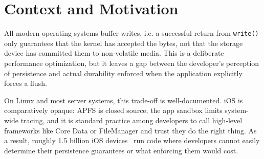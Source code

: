 \maketitle

\begin{abstract}
iOS persistence APIs make writes appear instantaneous by buffering in memory and flushing asynchronously, obscur-ing both when data becomes persisted and how much a developer pays to guarantee that durability. We built an iOS benchmarking app comparing three strategies: Core Data, an append-only log over FileManager, and per-event file writes, under default and aggressive (\verb|F_FULLFSYNC|) flush modes across seven payload sizes from 100 bytes to 50 MB. Across these 42 configurations, we discover that flush mode dominates latency. Aggressive flushing slows small Core Data writes ~235x and inflates a 50 MB Core Data write ~85,000x relative to default. Append-only writes pay only a 1.06–2.2x penalty, suggesting the choice of API matters far less than whether the developer ever forces a true flush. These results expose the implicit durability policies of iOS frameworks and the trade-offs they hide from app developers.
\end{abstract}


\section{Context and Motivation}

All modern operating systems buffer writes, i.e. a successful return from \verb|write()| only guarantees that the kernel has accepted the bytes, not that the storage device has committed them to non-volatile media. This is a deliberate performance optimization, but it leaves a gap between the developer's perception of persistence and actual durability enforced when the application explicitly forces a flush.

On Linux and most server systems, this trade-off is well-documented. iOS is comparatively opaque: APFS is closed source, the app sandbox limits system-wide tracing, and it is standard practice among developers to call high-level frameworks like Core Data or FileManager and trust they do the right thing. As a result, roughly 1.5 billion iOS devices~\cite{macrumors2026activedevices} run code where developers cannot easily determine their persistence guarantees or what enforcing them would cost.

